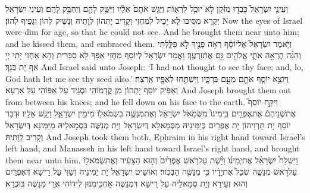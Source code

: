 {וְעֵינֵ֤י יִשְׂרָאֵל֙ כָּבְד֣וּ מִזֹּ֔קֶן לֹ֥א יוּכַ֖ל לִרְא֑וֹת וַיַּגֵּ֤שׁ אֹתָם֙ אֵלָ֔יו וַיִּשַּׁ֥ק לָהֶ֖ם וַיְחַבֵּ֥ק לָהֶֽם׃}
{וְעֵינֵי יִשְׂרָאֵל יְקַרָא מִסֵּיבוּ לָא יָכֵיל לְמִחְזֵי וְקָרֵיב יָתְהוֹן לְוָתֵיהּ וְנַשֵּׁיק לְהוֹן וְגָפֵיף לְהוֹן׃}
{Now the eyes of Israel were dim for age, so that he could not see. And he brought them near unto him; and he kissed them, and embraced them.}{}
{וַיֹּ֤אמֶר יִשְׂרָאֵל֙ אֶל\maqqaf יוֹסֵ֔ף רְאֹ֥ה פָנֶ֖יךָ לֹ֣א פִלָּ֑לְתִּי וְהִנֵּ֨ה הֶרְאָ֥ה אֹתִ֛י אֱלֹהִ֖ים גַּ֥ם אֶת\maqqaf זַרְעֶֽךָ׃}
{וַאֲמַר יִשְׂרָאֵל לְיוֹסֵף מִחְזֵי אַפָּךְ לָא סַבַּרִית וְהָא אַחְזִי יָתִי יְיָ אַף יָת בְּנָךְ׃}
{And Israel said unto Joseph: ‘I had not thought to see thy face; and, lo, God hath let me see thy seed also.’}{}
{וַיּוֹצֵ֥א יוֹסֵ֛ף אֹתָ֖ם מֵעִ֣ם בִּרְכָּ֑יו וַיִּשְׁתַּ֥חוּ לְאַפָּ֖יו אָֽרְצָה׃}
{וְאַפֵּיק יוֹסֵף יָתְהוֹן מִן קֳדָמוֹהִי וּסְגֵיד עַל אַפּוֹהִי עַל אַרְעָא׃}
{And Joseph brought them out from between his knees; and he fell down on his face to the earth.}{}
{וַיִּקַּ֣ח יוֹסֵף֮ אֶת\maqqaf שְׁנֵיהֶם֒ אֶת\maqqaf אֶפְרַ֤יִם בִּֽימִינוֹ֙ מִשְּׂמֹ֣אל יִשְׂרָאֵ֔ל וְאֶת\maqqaf מְנַשֶּׁ֥ה בִשְׂמֹאל֖וֹ מִימִ֣ין יִשְׂרָאֵ֑ל וַיַּגֵּ֖שׁ אֵלָֽיו׃}
{וּדְבַר יוֹסֵף יָת תַּרְוֵיהוֹן יָת אֶפְרַיִם בְּיַמִּינֵיהּ מִסְּמָאלָא דְּיִשְׂרָאֵל וְיָת מְנַשֶּׁה בִּסְמָאלֵיהּ מִיַּמִּינָא דְּיִשְׂרָאֵל וְקָרֵיב לְוָתֵיהּ׃}
{And Joseph took them both, Ephraim in his right hand toward Israel’s left hand, and Manasseh in his left hand toward Israel’s right hand, and brought them near unto him.}{}
{וַיִּשְׁלַח֩ יִשְׂרָאֵ֨ל אֶת\maqqaf יְמִינ֜וֹ וַיָּ֨שֶׁת עַל\maqqaf רֹ֤אשׁ אֶפְרַ֙יִם֙ וְה֣וּא הַצָּעִ֔יר וְאֶת\maqqaf שְׂמֹאל֖וֹ עַל\maqqaf רֹ֣אשׁ מְנַשֶּׁ֑ה שִׂכֵּל֙ אֶת\maqqaf יָדָ֔יו כִּ֥י מְנַשֶּׁ֖ה הַבְּכֽוֹר׃}
{וְאוֹשֵׁיט יִשְׂרָאֵל יָת יַמִּינֵיהּ וְשַׁוִּי עַל רֵישָׁא דְּאֶפְרַיִם וְהוּא זְעֵירָא וְיָת סְמָאלֵיהּ עַל רֵישָׁא דִּמְנַשֶּׁה אַחְכֵּימִנּוּן לִידוֹהִי אֲרֵי מְנַשֶּׁה בּוּכְרָא׃}
